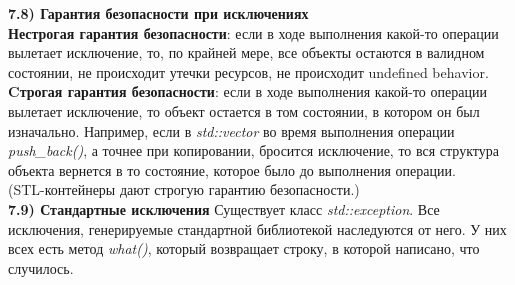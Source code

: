 \documentclass{article}
\begin{document}
\noindent \textbf{7.8) Гарантия безопасности при исключениях}\\
\textbf{Нестрогая гарантия безопасности}: если в ходе выполнения какой-то операции вылетает исключение, то, по крайней мере, все объекты остаются в валидном состоянии, не происходит утечки ресурсов, не происходит undefined behavior.\\
\textbf{Cтрогая гарантия безопасности}: если в ходе выполнения какой-то операции вылетает исключение, то объект остается в том состоянии, в котором он был изначально. Например, если в \textit{std::vector} во время выполнения операции \textit{push\_back()}, а точнее при копировании, бросится исключение, то вся структура объекта вернется в то состояние, которое было до выполнения операции.\\
(STL-контейнеры дают строгую гарантию безопасности.)\\
\noindent \textbf{7.9) Стандартные исключения}
Существует класс \textit{std::exception}. Все исключения, генерируемые стандартной библиотекой наследуются от него. У них всех есть метод \textit{what()}, который возвращает строку, в которой написано, что случилось.
\end{document}
